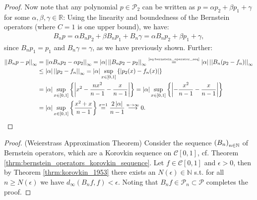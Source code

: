 \begin{proof}
	Now note that any polynomial $p\in\mathcal P_2$ can be written as $p = \alpha p_2 + \beta p_1 + \gamma$ for some $\alpha, \beta, \gamma\in\mathbb R$: Using the linearity and boundedness of the Bernstein operators (where $C=1$ is one upper bound), we have:
	\begin{align}
		B_n p = \alpha B_n p_2 + \beta B_np_1 + B_n\gamma = \alpha B_n p_2 + \beta p_1 + \gamma,
	\end{align}
	since $B_n p_1 = p_1$ and $B_n\gamma = \gamma$, as we have previously shown. Further:
	\begin{align}
		\begin{split}
			\norm{B_n p - p}{\infty} &= \norm{\alpha B_np_2 - \alpha p_2}{\infty} = \abs{\alpha}\norm{B_n p_2 - p_2}{\infty} \overset{\tiny\eqref{eq:bernstein_operator_seq}}{=} \abs{\alpha}\norm{B_n(p_2 - f_n)}{\infty}
			\\ &\leq \abs{\alpha}\norm{p_2 - f_n}{\infty} = \abs{\alpha}\sup_{x\in[0, 1]}\left\{\abs{p_2(x) - f_n(x)}\right\} 
			\\ &= \abs{\alpha}\sup_{x\in[0, 1]}\left\{\abs{x^2 - \frac{nx^2}{n-1}- \frac{x}{n-1}}\right\} = \abs{\alpha}\sup_{x\in[0, 1]}\left\{\abs{- \frac{x^2}{n-1}- \frac{x}{n-1}}\right\}
			\\ &= \abs{\alpha}\sup_{x\in[0, 1]}\left\{ \frac{x^2 + x}{n-1} \right\} \overset{x=1}{=}\frac{2\abs{\alpha}}{n-1} \overset{n\to\infty}{\longrightarrow} 0.
		\end{split}
	\end{align}	 
\end{proof}

\begin{proof}(Weierstrass Approximation Theorem)
	Consider the sequence $\seq[B_n]$ of Bernstein operators, which are a Korovkin sequence on $\mathcal C[0, 1]$, cf. Theorem \ref{thrm:bernstein_operators_korovkin_sequence}. Let $f\in\mathcal C[0, 1]$ and $\epsilon > 0$, then by Theorem \ref{thrm:korovkin_1953} there exists an $N(\epsilon)\in\mathbb N$ s.t. for all $n\geq N(\epsilon)$ we have $d_{\infty}(B_nf, f) < \epsilon$. Noting that $B_nf\in\mathcal P_n\subset \mathcal P$ completes the proof.
\end{proof}
	
